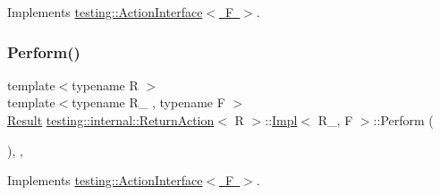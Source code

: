 Implements \mbox{\hyperlink{classtesting_1_1_action_interface_a20f8624fcea1786f2992b358760422a0}{testing\+::\+Action\+Interface$<$ F $>$}}.

\mbox{\label{classtesting_1_1internal_1_1_return_action_1_1_impl_a75639b38ed9daff7f07099a7703018ad}} 
\subsubsection{\texorpdfstring{Perform()}{Perform()}\hspace{0.1cm}{\footnotesize\ttfamily [2/3]}}
{\footnotesize\ttfamily template$<$typename R $>$ \\
template$<$typename R\+\_\+ , typename F $>$ \\
\mbox{\hyperlink{classtesting_1_1_action_interface_a7477de2fe3e4e01c59db698203acaee7}{Result}} \mbox{\hyperlink{classtesting_1_1internal_1_1_return_action}{testing\+::internal\+::\+Return\+Action}}$<$ R $>$\+::\mbox{\hyperlink{classtesting_1_1internal_1_1_return_action_1_1_impl}{Impl}}$<$ R\+\_\+, F $>$\+::Perform (\begin{DoxyParamCaption}\item[{const \mbox{\hyperlink{classtesting_1_1_action_interface_af72720d864da4d606629e83edc003511}{Argument\+Tuple}} \&}]{ }\end{DoxyParamCaption})\hspace{0.3cm}{\ttfamily [inline]}, {\ttfamily [override]}, {\ttfamily [virtual]}}



Implements \mbox{\hyperlink{classtesting_1_1_action_interface_a20f8624fcea1786f2992b358760422a0}{testing\+::\+Action\+Interface$<$ F $>$}}.

\mbox{\label{classtesting_1_1internal_1_1_return_action_1_1_impl_ad643ea98eada205da6c4bcfb6c66cd2c}} 
